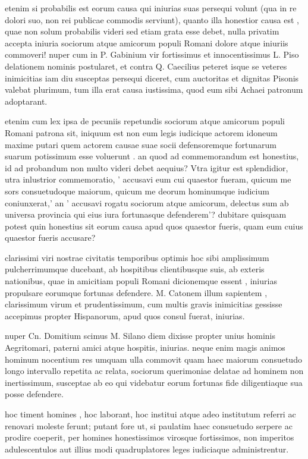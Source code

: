  etenim si probabilis est eorum causa qui iniurias suas persequi volunt (qua in re dolori suo, non rei publicae commodis serviunt), quanto illa honestior causa est , quae non solum probabilis videri sed etiam grata esse debet, nulla privatim accepta iniuria sociorum atque amicorum populi Romani dolore atque iniuriis commoveri! nuper cum in P. Gabinium vir fortissimus et innocentissimus L. Piso delationem nominis postularet, et contra Q. Caecilius peteret isque se veteres inimicitias iam diu susceptas persequi diceret, cum auctoritas et dignitas Pisonis valebat plurimum, tum illa erat causa iustissima, quod eum sibi Achaei patronum adoptarant.

 etenim cum lex ipsa de pecuniis repetundis sociorum atque amicorum populi Romani patrona sit, iniquum est non eum legis iudicique actorem idoneum maxime putari quem actorem causae suae socii defensoremque fortunarum suarum potissimum esse voluerunt . an quod ad commemorandum est honestius, id ad probandum non multo videri debet aequius? Vtra igitur est splendidior, utra inlustrior commemoratio, ' accusavi eum cui quaestor fueram, quicum me sors consuetudoque maiorum, quicum me deorum hominumque iudicium coniunxerat,' an ' accusavi rogatu sociorum atque amicorum, delectus sum ab universa provincia qui eius iura fortunasque defenderem'? dubitare quisquam potest quin honestius sit eorum causa apud quos quaestor fueris, quam eum cuius quaestor fueris accusare?

 clarissimi viri nostrae civitatis temporibus optimis hoc sibi amplissimum pulcherrimumque ducebant, ab hospitibus clientibusque suis, ab exteris nationibus, quae in amicitiam populi Romani dicionemque essent , iniurias propulsare eorumque fortunas defendere. M. Catonem illum sapientem , clarissimum virum et prudentissimum, cum multis gravis inimicitias gessisse accepimus propter Hispanorum, apud quos consul fuerat, iniurias.

 nuper Cn. Domitium scimus M. Silano diem dixisse propter unius hominis Aegritomari, paterni amici atque hospitis, iniurias. neque enim magis animos hominum nocentium res umquam ulla commovit quam haec maiorum consuetudo longo intervallo repetita ac relata, sociorum querimoniae delatae ad hominem non inertissimum, susceptae ab eo qui videbatur eorum fortunas fide diligentiaque sua posse defendere.

 hoc timent homines , hoc laborant, hoc institui atque adeo institutum referri ac renovari moleste ferunt; putant fore ut, si paulatim haec consuetudo serpere ac prodire coeperit, per homines honestissimos virosque fortissimos, non imperitos adulescentulos aut illius modi quadruplatores leges iudiciaque administrentur.

